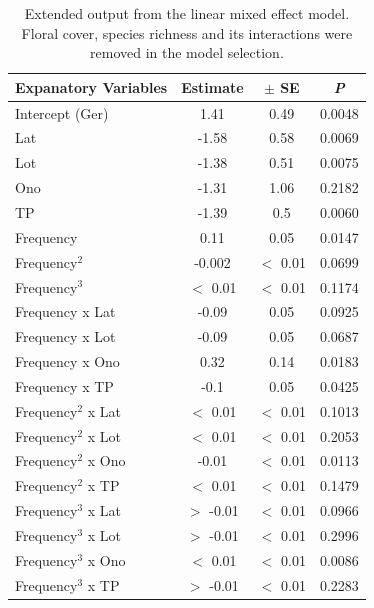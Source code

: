 \begin{table} [!htbp]
	\centering
	\caption{Extended output from the linear mixed effect model. Floral cover, species richness and its interactions were removed in the model selection.}
	\begin{tabular}{lccc}
		\toprule
		\textbf{Expanatory Variables} & \textbf{Estimate} & \textbf{$\pm$ SE} &  \textbf{\textit{P}} \\
		\midrule
		Intercept (Ger) & 1.41 & 0.49  & 0.0048 \\ 
		Lat	& -1.58 & 0.58 & 0.0069 \\ 
		Lot	& -1.38 & 0.51 & 0.0075 \\ 
		Ono	& -1.31 & 1.06 & 0.2182 \\ 
		TP	& -1.39 & 0.5  & 0.0060 \\ 
		\addlinespace[0.2cm]
		Frequency	& 0.11 & 0.05 & 0.0147 \\
		Frequency$^{2}$	& -0.002 &  $<$ 0.01 & 0.0699 \\ 
		Frequency$^{3}$	& $<$ 0.01 & $<$ 0.01 & 0.1174 \\ 
		\addlinespace[0.2cm]
		Frequency x Lat	& -0.09 & 0.05 & 0.0925 \\
		Frequency x Lot	& -0.09 &  0.05 & 0.0687 \\ 
		Frequency x Ono	& 0.32 & 0.14 & 0.0183 \\ 
		Frequency x TP	& -0.1 & 0.05 & 0.0425 \\
		\addlinespace[0.2cm] 
		Frequency$^{2}$ x Lat	& $<$ 0.01 & $<$ 0.01 & 0.1013 \\
		Frequency$^{2}$ x Lot	& $<$ 0.01 & $<$ 0.01 & 0.2053 \\ 
		Frequency$^{2}$ x Ono	& -0.01 & $<$ 0.01 & 0.0113 \\ 
		Frequency$^{2}$ x TP	& $<$ 0.01 & $<$ 0.01 & 0.1479 \\ 
		\addlinespace[0.2cm]
		Frequency$^{3}$ x Lat	& $>$ -0.01 & $<$ 0.01 & 0.0966 \\
		Frequency$^{3}$ x Lot	& $>$ -0.01 & $<$ 0.01 & 0.2996 \\ 
		Frequency$^{3}$ x Ono	& $<$ 0.01 & $<$ 0.01 & 0.0086 \\ 
		Frequency$^{3}$ x TP	& $>$ -0.01 & $<$ 0.01 & 0.2283 \\
		\bottomrule
	\end{tabular}
	\label{tab:summary} 
\end{table}

\newpage


